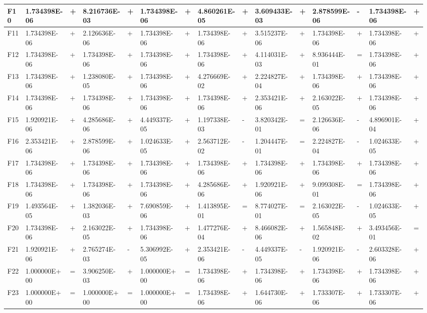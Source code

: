\documentclass{article} %
\begin{document}
\begin{tabular}{|p{0.3in}|p{0.5in}|p{0.2in}|p{0.5in}|p{0.2in}|p{0.6in}|p{0.1in}|p{0.6in}|p{0.1in}|p{0.5in}|p{0.1in}|p{0.5in}|p{0.1in}|p{0.5in}|p{0.2in}|}
F10 & 1.734398E-06 & + & 8.216736E-03 & + & 1.734398E-06 & + & 4.860261E-05 & + & 3.609433E-03 & + & 2.878599E-06 & - & 1.734398E-06 & + \\ \hline 
F11 & 1.734398E-06 & + & 2.126636E-06 & + & 1.734398E-06 & + & 1.734398E-06 & + & 3.515237E-06 & + & 1.734398E-06 & + & 1.734398E-06 & + \\ \hline 
F12 & 1.734398E-06 & + & 1.734398E-06 & + & 1.734398E-06 & + & 1.734398E-06 & + & 4.114031E-03 & + & 8.936444E-01 & = & 1.734398E-06 & + \\ \hline 
F13 & 1.734398E-06 & + & 1.238080E-05 & + & 1.734398E-06 & + & 4.276669E-02 & + & 2.224827E-04 & + & 1.734398E-06 & + & 1.734398E-06 & + \\ \hline 
F14 & 1.734398E-06 & + & 1.734398E-06 & + & 1.734398E-06 & + & 1.734398E-06 & + & 2.353421E-06 & + & 2.163022E-05 & + & 1.734398E-06 & + \\ \hline 
F15 & 1.920921E-06 & + & 4.285686E-06 & + & 4.449337E-05 & + & 1.197338E-03 & - & 3.820342E-01 & = & 2.126636E-06 & - & 4.896901E-04 & + \\ \hline 
F16 & 2.353421E-06 & + & 2.878599E-06 & + & 1.024633E-05 & + & 2.563712E-02 & - & 1.204447E-01 & = & 2.224827E-04 & - & 1.024633E-05 & + \\ \hline 
F17 & 1.734398E-06 & + & 1.734398E-06 & + & 1.734398E-06 & + & 1.734398E-06 & + & 1.734398E-06 & + & 1.734398E-06 & + & 1.734398E-06 & + \\ \hline 
F18 & 1.734398E-06 & + & 1.734398E-06 & + & 1.734398E-06 & + & 4.285686E-06 & + & 1.920921E-06 & + & 9.099308E-01 & = & 1.734398E-06 & + \\ \hline 
F19 & 1.493564E-05 & + & 1.382036E-03 & + & 7.690859E-06 & + & 1.413895E-01 & = & 8.774027E-01 & = & 2.163022E-05 & - & 1.024633E-05 & + \\ \hline 
F20 & 1.734398E-06 & + & 2.163022E-05 & + & 1.734398E-06 & + & 1.477276E-04 & + & 8.466082E-06 & + & 1.565848E-02 & + & 3.493456E-01 & = \\ \hline 
F21 & 1.920921E-06 & + & 2.765274E-03 & - & 5.306992E-05 & + & 2.353421E-06 & - & 4.449337E-05 & - & 1.920921E-06 & - & 2.603328E-06 & + \\ \hline 
F22 & 1.000000E+00 & = & 3.906250E-03 & + & 1.000000E+00 & = & 1.734398E-06 & + & 1.734398E-06 & + & 1.734398E-06 & + & 1.734398E-06 & + \\ \hline 
F23 & 1.000000E+00 & = & 1.000000E+00 & = & 1.000000E+00 & = & 1.734398E-06 & + & 1.644730E-06 & + & 1.733307E-06 & + & 1.733307E-06 & + \\ \hline 

\end{tabular}
\end{document}
